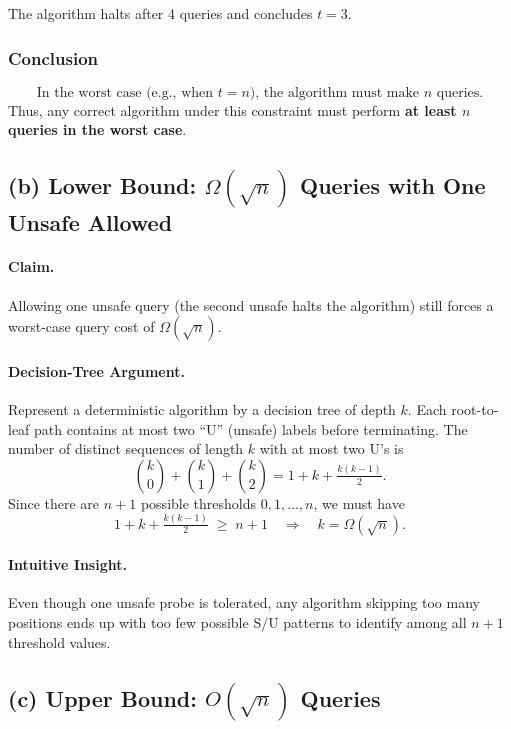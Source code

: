 \documentclass[12pt]{article}
\begin{document}
	The algorithm halts after 4 queries and concludes $t = 3$.
	
	\subsubsection*{Conclusion}
	\[
	\boxed{
		\text{In the worst case (e.g., when } t = n \text{), the algorithm must make } n \text{ queries.}
	}
	\]
	Thus, any correct algorithm under this constraint must perform \textbf{at least $n$ queries in the worst case}.
	
	
	\subsection*{(b) Lower Bound: $\Omega(\sqrt{n})$ Queries with One Unsafe Allowed}
	
	\paragraph{Claim.}
	Allowing one unsafe query (the second unsafe halts the algorithm) still forces a worst-case query cost of $\Omega(\sqrt{n})$.
	
	\paragraph{Decision-Tree Argument.}
	Represent a deterministic algorithm by a decision tree of depth $k$.  Each root-to-leaf path contains at most two ``U'' (unsafe) labels before terminating.  The number of distinct sequences of length $k$ with at most two U's is
	\[
	\binom{k}{0} + \binom{k}{1} + \binom{k}{2}
	=1 + k + \tfrac{k(k-1)}2.
	\]
	Since there are $n+1$ possible thresholds $0,1,\dots,n$, we must have
	\[
	1 + k + \tfrac{k(k-1)}2 \;\ge\; n+1
	\quad\Longrightarrow\quad
	k = \Omega(\sqrt{n}).
	\]
	
	\paragraph{Intuitive Insight.}
	Even though one unsafe probe is tolerated, any algorithm skipping too many positions ends up with too few possible S/U patterns to identify among all $n+1$ threshold values.
	
	\subsection*{(c) Upper Bound: $O(\sqrt{n})$ Queries}
	
\end{document}
